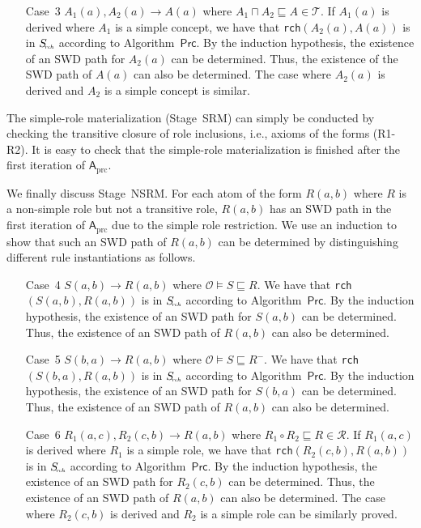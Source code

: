 \begin{enumerate}[leftmargin=12ex]
\item[Case~3] $A_1(a),A_2(a)\rightarrow A(a)$ where $A_1\sqcap A_2\sqsubseteq A\in\mathcal{T}$.
    If $A_1(a)$ is derived where $A_1$ is a simple concept,
    we have that \texttt{rch}$(A_2(a),A(a))$ is in $S_{\textit{\!\tiny rch}}$
    according to Algorithm~$\mathsf{Prc}$.
    By the induction hypothesis, the existence of an SWD path for $A_2(a)$ can be determined.
    Thus, the existence of the SWD path of $A(a)$ can also be determined.
    The case where $A_2(a)$ is derived and $A_2$ is a simple concept is similar.
\end{enumerate}

The simple-role materialization (Stage~SRM) can simply be conducted by checking the transitive closure
of role inclusions, i.e., axioms of the forms (R1-R2).
It is easy to check that the simple-role materialization is finished after the
first iteration of $\mathsf{A}_{\text{prc}}$.

We finally discuss Stage~NSRM. For each atom of the form $R(a,b)$ where $R$ is a non-simple role
but not a transitive role,
$R(a,b)$ has an SWD path in the first iteration of $\mathsf{A}_{\text{prc}}$ due to the simple role restriction.
We use an induction to show that
such an SWD path of $R(a,b)$ can be determined by distinguishing different rule instantiations
as follows.

\begin{enumerate}[leftmargin=12ex]
\item[Case~4] $S(a,b)\rightarrow R(a,b)$ where $\mathcal{O}\models S\sqsubseteq R$.
    We have that \texttt{rch}$(S(a,b),R(a,b))$ is in $S_{\textit{\!\tiny rch}}$
    according to Algorithm~$\mathsf{Prc}$.
    By the induction hypothesis, the existence of an SWD path for $S(a,b)$ can be determined.
    Thus, the existence of an SWD path of $R(a,b)$ can also be determined.

\item[Case~5] $S(b,a)\rightarrow R(a,b)$ where $\mathcal{O}\models S\sqsubseteq R^-$.
    We have that \texttt{rch}$(S(b,a),R(a,b))$ is in $S_{\textit{\!\tiny rch}}$
    according to Algorithm~$\mathsf{Prc}$.
    By the induction hypothesis, the existence of an SWD path for $S(b,a)$ can be determined.
    Thus, the existence of an SWD path of $R(a,b)$ can also be determined.

\item[Case~6] $R_1(a,c),R_2(c,b)\rightarrow R(a,b)$ where $R_1\circ R_2\sqsubseteq R\in\mathcal{R}$.
    If $R_1(a,c)$ is derived where $R_1$ is a simple role,
    we have that \texttt{rch}$(R_2(c,b),R(a,b))$ is in $S_{\textit{\!\tiny rch}}$
    according to Algorithm~$\mathsf{Prc}$.
    By the induction hypothesis, the existence of an SWD path for $R_2(c,b)$ can be determined.
    Thus, the existence of an SWD path of $R(a,b)$ can also be determined.
    The case where $R_2(c,b)$ is derived and $R_2$ is a simple role can be similarly proved.
\end{enumerate}

